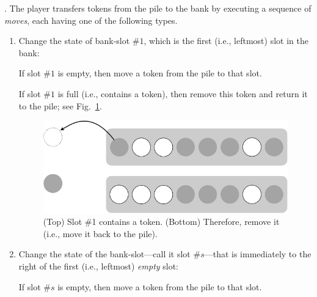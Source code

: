 .
The player transfers tokens from the pile to the bank by executing a sequence of {\it moves}, each having one of the following types.
\begin{enumerate}
\item
Change the state of bank-slot \#$1$, which is the first (i.e., leftmost) slot in the bank:

\smallskip

If slot \#$1$ is empty, then move a token from the pile to that slot.

\smallskip

If slot \#$1$ is full (i.e., contains a token), then remove this token and return it to the pile; see Fig.~\ref{fig:rule1}.
\begin{figure}[h]
\begin{center}
        \includegraphics[scale=0.3]{FiguresMaths/GameTokenRule1.png}
\caption{(Top) Slot \#1 contains a token.  (Bottom) Therefore, remove it (i.e., move it back to the pile).}
        \label{fig:rule1}
\end{center}
\end{figure}

\medskip\item
Change the state of the bank-slot---call it slot \#$s$---that is immediately to the right of the first (i.e., leftmost) {\em empty} slot:

\smallskip

If slot \#$s$ is empty, then move a token from the pile to that slot.

\smallskip


\end{enumerate}
